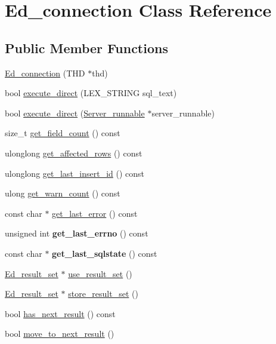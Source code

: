\hypertarget{classEd__connection}{}\section{Ed\+\_\+connection Class Reference}
\label{classEd__connection}
\subsection*{Public Member Functions}
\begin{DoxyCompactItemize}
\item 
\mbox{\hyperlink{classEd__connection_a31ae0e49095b5784dcccc495d6e2bcfe}{Ed\+\_\+connection}} (T\+HD $\ast$thd)
\item 
bool \mbox{\hyperlink{classEd__connection_a58f9da6381da4bc1455d7f22d1620d2d}{execute\+\_\+direct}} (L\+E\+X\+\_\+\+S\+T\+R\+I\+NG sql\+\_\+text)
\item 
bool \mbox{\hyperlink{classEd__connection_afd0499324ba204c8a00480a3706c5bfb}{execute\+\_\+direct}} (\mbox{\hyperlink{classServer__runnable}{Server\+\_\+runnable}} $\ast$server\+\_\+runnable)
\item 
size\+\_\+t \mbox{\hyperlink{classEd__connection_af704fb99d9029578af2d1acc301b8d51}{get\+\_\+field\+\_\+count}} () const
\item 
ulonglong \mbox{\hyperlink{classEd__connection_afba697853fd865d59c2bfbf851e926fe}{get\+\_\+affected\+\_\+rows}} () const
\item 
ulonglong \mbox{\hyperlink{classEd__connection_a5a3a3b208a58521911bddc57732cecc7}{get\+\_\+last\+\_\+insert\+\_\+id}} () const
\item 
ulong \mbox{\hyperlink{classEd__connection_afc2fcf1d521b29f06621fc01714b69a0}{get\+\_\+warn\+\_\+count}} () const
\item 
const char $\ast$ \mbox{\hyperlink{classEd__connection_a420c219d0c2e058af3666076a2bfaa17}{get\+\_\+last\+\_\+error}} () const
\item 
\mbox{\label{classEd__connection_a56622fa194cb3ccee12bcd9bf7bedd5e}} 
unsigned int {\bfseries get\+\_\+last\+\_\+errno} () const
\item 
\mbox{\label{classEd__connection_aff7bcb2c3a704ee97bfd58ffe17a9802}} 
const char $\ast$ {\bfseries get\+\_\+last\+\_\+sqlstate} () const
\item 
\mbox{\hyperlink{classEd__result__set}{Ed\+\_\+result\+\_\+set}} $\ast$ \mbox{\hyperlink{classEd__connection_ab9b5405ab89c8dc49082adf1a3be3354}{use\+\_\+result\+\_\+set}} ()
\item 
\mbox{\hyperlink{classEd__result__set}{Ed\+\_\+result\+\_\+set}} $\ast$ \mbox{\hyperlink{classEd__connection_ad80317ac21aa245c7a0d1162ac98b264}{store\+\_\+result\+\_\+set}} ()
\item 
bool \mbox{\hyperlink{classEd__connection_a6f1e1b950bf2e7c332e73579f1a2fd51}{has\+\_\+next\+\_\+result}} () const
\item 
bool \mbox{\hyperlink{classEd__connection_aa4c7282bcb1c1fdf2fa966a2106c71bd}{move\+\_\+to\+\_\+next\+\_\+result}} ()
\end{DoxyCompactItemize}
